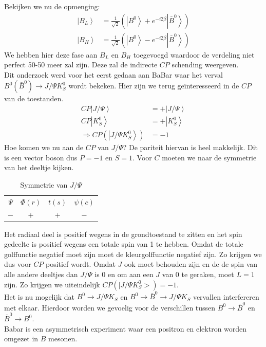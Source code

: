 \documentclass[../main.tex]{subfiles}
\begin{document}
Bekijken we nu de opmenging:
\begin{equation}
    \begin{aligned}
        \label{eq:b_opmenging}
        \left| B_{L}\right>&=\frac{1}{\sqrt{2}}\left(\left|B^{0}\right>+e^{-i 2 \beta}\left| \bar{B}^{0}\right>\right) \\
        \left| B_{H}\right>&=\frac{1}{\sqrt{2}}\left(\left|B^{0}\right>-e^{-i 2 \beta}\left| \bar{B}^{0}\right>\right)
    \end{aligned}
\end{equation}
We hebben hier deze fase aan $B_L$ en $B_H$ toegevoegd waardoor de verdeling niet perfect 50-50 meer zal zijn. Deze zal de indirecte $CP$ schending weergeven.\\
Dit onderzoek werd voor het eerst gedaan aan BaBar waar het verval $B^{0}\left(\bar{B}^{0}\right) \rightarrow J / \Psi K_{S}^{0}$ wordt bekeken. Hier zijn we terug geïnteresseerd in de $CP$ van de toestanden.
\begin{equation}
    \begin{aligned}
        \label{eq:cp_toestanden}
        C P\left|J / \Psi\right>&=+\left| J / \Psi\right>\\
        C P\left|K_{S}^{0}\right>&=+\left| K_{S}^{0}\right>\\
        \Rightarrow C P\left(\left| J / \Psi K_{S}^{0}\right>\right)&=-1
    \end{aligned}
\end{equation}
Hoe komen we nu aan de $CP$ van $J / \Psi$? De pariteit hiervan is heel makkelijk. Dit is een vector boson dus $P=-1$ en $S=1$. Voor $C$ moeten we naar de symmetrie van het deeltje kijken.

\begin{table}[h]
    \centering
    \caption{Symmetrie van $J / \Psi$}
    \label{tab:label}
    \begin{tabular}{cccc}
        $\Psi$ & $\Phi(r)$ & $t(s)$ & $\psi(c)$ \\
        $-$    & $+$       & $+$    & $-$
    \end{tabular}
\end{table}

Het radiaal deel is positief wegens in de grondtoestand te zitten en het spin gedeelte is positief wegens een totale spin van 1 te hebben. Omdat de totale golffunctie negatief moet zijn moet de kleurgolffunctie negatief zijn. Zo krijgen we dus voor $CP$ positief wordt. Omdat $J$ ook moet behouden zijn en de de spin van alle andere deeltjes dan $J / \Psi$ is 0 en om aan een $J$ van 0 te geraken, moet $L=1$ zijn. Zo krijgen we uiteindelijk $C P\left(\mid J / \Psi K_{S}^{0}>\right)=-1$.\\
Het is nu mogelijk dat $B^{0} \rightarrow J / \Psi K_{S}$ en $B^{0} \rightarrow \bar{B}^{0} \rightarrow J / \Psi K_{S}$ vervallen interfereren met elkaar. Hierdoor worden we gevoelig voor de verschillen tussen $B^{0} \rightarrow \bar{B}^{0}$ en $\bar{B}^{0} \rightarrow B^{0}$.\\
Babar is een asymmetrisch experiment waar een positron en elektron worden omgezet in $B$ mesonen.
\end{document}
